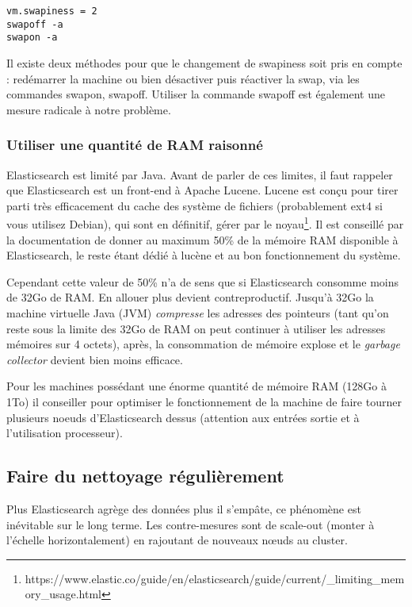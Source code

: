 {\begin{lstlisting}[style=code,label={lst:configswapiness},caption={Configuration swapiness}]
vm.swapiness = 2
swapoff -a
swapon -a
\end{lstlisting}
Il existe deux méthodes pour que le changement de swapiness soit pris en compte :
redémarrer la machine ou bien désactiver puis réactiver la swap, via les commandes
swapon, swapoff. Utiliser la commande swapoff est également une mesure radicale à 
notre problème.

\subsubsection{Utiliser une quantité de RAM raisonné}
Elasticsearch est limité par Java. Avant de parler de ces limites, il faut rappeler 
que Elasticsearch est un front-end à Apache Lucene. Lucene est conçu pour tirer 
parti très efficacement du cache des système de fichiers (probablement ext4 si 
vous utilisez Debian), qui sont en définitif, gérer par le 
noyau\footnote{https://www.elastic.co/guide/en/elasticsearch/guide/current/\_limiting\_memory\_usage.html}.
Il est conseillé par la documentation de donner au maximum 50\% de la mémoire RAM
disponible à Elasticsearch, le reste étant dédié à lucène et au bon fonctionnement
du système.

Cependant cette valeur de 50\% n'a de sens que si Elasticsearch consomme moins de 
32Go de RAM. En allouer plus devient contreproductif. Jusqu'à 32Go
la machine virtuelle Java (JVM) \textit{compresse} les adresses des pointeurs 
(tant qu'on reste sous la limite des 32Go de RAM on peut continuer à utiliser les 
adresses mémoires sur 4 octets), après, la consommation de mémoire explose et le
\textit{garbage collector} devient bien moins efficace.

Pour les machines possédant une énorme quantité de mémoire RAM (128Go à 1To)
il conseiller pour optimiser le fonctionnement de la machine de faire tourner plusieurs
noeuds d'Elasticsearch dessus (attention aux entrées sortie et à l'utilisation processeur).

\subsection{Faire du nettoyage régulièrement}
Plus Elasticsearch agrège des données plus il s'empâte, ce phénomène est inévitable 
sur le long terme. Les contre-mesures sont de scale-out (monter à l'échelle horizontalement)
en rajoutant de nouveaux nœuds au cluster. 

}
